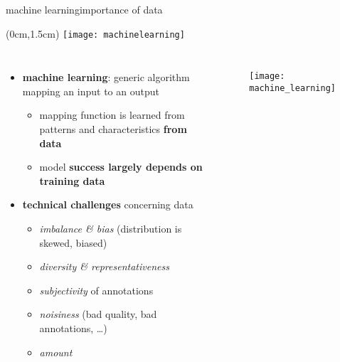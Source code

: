 \begin{frame}{machine learning}{importance of data}
    \vspace{-5mm}
    \begin{textblock*}{100mm}(0cm,1.5cm)
        \texttt{[image: machinelearning]}
    \end{textblock*}           
    
    \begin{columns}
    \begin{itemize}
 
        \item<1->   \textbf{machine learning}: generic algorithm mapping an input to an output
            \begin{itemize}
                \item<2->   mapping function is learned from patterns and characteristics \textbf{from data}
                \item<2->[$\Rightarrow$]   model \textbf{success largely depends on training data}
                
            \end{itemize}
        \bigskip
        \item<3->   \textbf{technical challenges} concerning data
            \begin{itemize}
                \item   \textit{imbalance \& bias} (distribution is skewed, biased)
                \item   \textit{diversity \& representativeness} %
                \item   \textit{subjectivity} of annotations
                \item   \textit{noisiness} (bad quality, bad annotations, \ldots)
                \item   \textit{amount}
            \end{itemize}
    \end{itemize}
        \vspace{-5mm}
        \begin{figure}
            \texttt{[image: machine\_learning]}
        \end{figure}
    \end{columns}
\end{frame}

